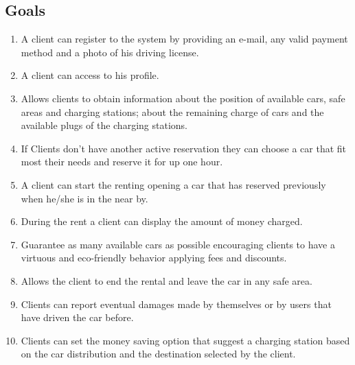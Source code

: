\documentclass[a4paper]{article}
\begin{document}
\subsection{Goals}

\begin{enumerate}
\item A client can register to the system by providing an e-mail, any valid payment method and a photo of his driving license.

\item A client can access to his profile.

\item Allows clients to obtain information about
the position of available cars, safe areas and charging stations; about the remaining charge of cars and the available plugs of the charging stations.

\item If Clients don’t have another active reservation they can choose a car that fit most their needs and reserve it for up one hour.

\item A client can start the renting opening a car that has reserved previously when he/she is in the near by.

\item During the rent a client can display the amount of money charged.

\item Guarantee as many available cars as possible encouraging clients to have a virtuous and eco-friendly behavior applying fees and discounts.

\item Allows the client to end the rental and leave the car in any safe area.

\item Clients can report eventual damages made by themselves or by users that have driven the car before.

\item Clients can set the money saving option that suggest a charging station based on the car distribution and the destination selected by the client.


\end{enumerate}
\end{document}
